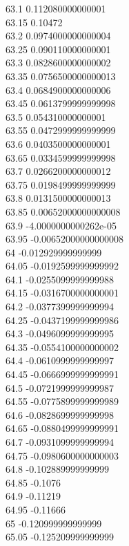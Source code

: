 {63.1	0.112080000000001\\
63.15	0.10472\\
63.2	0.0974000000000004\\
63.25	0.090110000000001\\
63.3	0.0828600000000002\\
63.35	0.0756500000000013\\
63.4	0.0684900000000006\\
63.45	0.0613799999999998\\
63.5	0.054310000000001\\
63.55	0.0472999999999999\\
63.6	0.0403500000000001\\
63.65	0.0334599999999998\\
63.7	0.0266200000000012\\
63.75	0.0198499999999999\\
63.8	0.0131500000000013\\
63.85	0.00652000000000008\\
63.9	-4.0000000000262e-05\\
63.95	-0.00652000000000008\\
64	-0.012929999999999\\
64.05	-0.0192599999999992\\
64.1	-0.0255099999999988\\
64.15	-0.0316700000000001\\
64.2	-0.0377399999999994\\
64.25	-0.0437199999999986\\
64.3	-0.0496099999999995\\
64.35	-0.0554100000000002\\
64.4	-0.0610999999999997\\
64.45	-0.0666999999999991\\
64.5	-0.0721999999999987\\
64.55	-0.0775899999999989\\
64.6	-0.0828699999999998\\
64.65	-0.0880499999999991\\
64.7	-0.0931099999999994\\
64.75	-0.0980600000000003\\
64.8	-0.102889999999999\\
64.85	-0.1076\\
64.9	-0.11219\\
64.95	-0.11666\\
65	-0.120999999999999\\
65.05	-0.125209999999999\\
}
